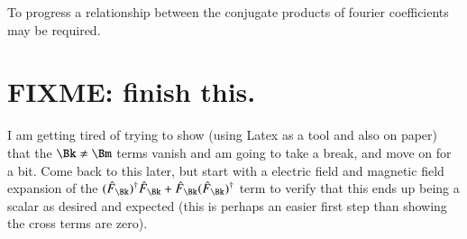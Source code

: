 \documentclass{article}
\begin{document}
To progress a relationship between the conjugate products of fourier coefficients may be required.

\section{ FIXME: finish this. }

I am getting tired of trying to show (using Latex as a tool and also on paper)
that the $\Bk \ne \Bm$ terms vanish and am going to take a break, and move on for a bit.  Come back to this later, but start
with a electric field and magnetic field expansion of the $
(\hat{F}_\Bk)^\dagger \hat{F}_\Bk
+
\hat{F}_\Bk (\hat{F}_\Bk)^\dagger 
$ term to verify that this ends up being a scalar as desired and expected
(this is perhaps an easier first step than showing the cross terms are zero).



\end{document}
